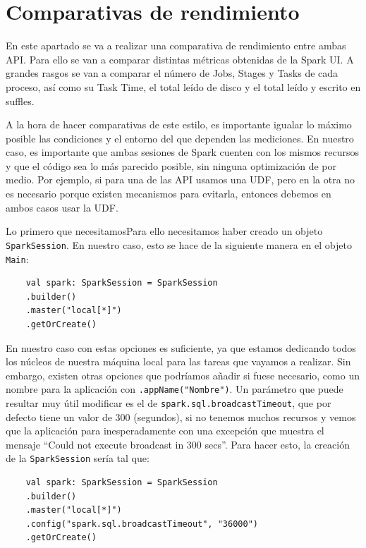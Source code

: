 \documentclass[12pt,twoside,titlepage]{report}
\newcommand{\quotes}[1]{``#1''}
\begin{document}
\section{Comparativas de rendimiento}

En este apartado se va a realizar una comparativa de rendimiento entre ambas API. Para ello se van a comparar distintas métricas obtenidas de la Spark UI. A grandes rasgos se van a comparar el número de Jobs, Stages y Tasks de cada proceso, así como su Task Time, el total leído de disco y el total leído y escrito en suffles.

A la hora de hacer comparativas de este estilo, es importante igualar lo máximo posible las condiciones y el entorno del que dependen las mediciones. En nuestro caso, es importante que ambas sesiones de Spark cuenten con los mismos recursos y que el código sea lo más parecido posible, sin ninguna optimización de por medio. Por ejemplo, si para una de las API usamos una UDF, pero en la otra no es necesario porque existen mecanismos para evitarla, entonces debemos en ambos casos usar la UDF.

Lo primero que necesitamosPara ello necesitamos haber creado un objeto \texttt{SparkSession}. En nuestro caso, esto se hace de la siguiente manera en el objeto \texttt{Main}:

\begin{lstlisting}
	val spark: SparkSession = SparkSession
	.builder()
	.master("local[*]")
	.getOrCreate()
\end{lstlisting}

En nuestro caso con estas opciones es suficiente, ya que estamos dedicando todos los núcleos de nuestra máquina local para las tareas que vayamos a realizar. Sin embargo, existen otras opciones que podríamos añadir si fuese necesario, como un nombre para la aplicación con \texttt{.appName("Nombre")}. Un parámetro que puede resultar muy útil modificar es el de \texttt{spark.sql.broadcastTimeout}, que por defecto tiene un valor de 300 (segundos), si no tenemos muchos recursos y vemos que la aplicación para inesperadamente con una excepción que muestra el mensaje \quotes{Could not execute broadcast in 300 secs}. Para hacer esto, la creación de la \texttt{SparkSession} sería tal que:

\begin{lstlisting}
	val spark: SparkSession = SparkSession
	.builder()
	.master("local[*]")
	.config("spark.sql.broadcastTimeout", "36000")
	.getOrCreate()
\end{lstlisting}
\end{document}
